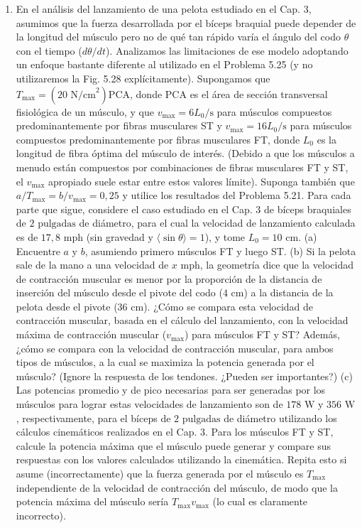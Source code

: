 \documentclass[12pt]{book}
\begin{document}
\begin{enumerate}
\item[5.26] En el análisis del lanzamiento de una pelota estudiado en el Cap. 3, asumimos que la fuerza desarrollada por el bíceps braquial puede depender de la longitud del músculo pero no de qué tan rápido varía el ángulo del codo $\theta$ con el tiempo ($d\theta/dt$). Analizamos las limitaciones de ese modelo adoptando un enfoque bastante diferente al utilizado en el Problema 5.25 (y no utilizaremos la Fig. 5.28 explícitamente). Supongamos que $T_{\text{max}} = (20\text{ N/cm}^2)\text{PCA}$, donde $\text{PCA}$ es el área de sección transversal fisiológica de un músculo, y que $v_{\text{max}} = 6 L_0/\text{s}$ para músculos compuestos predominantemente por fibras musculares ST y $v_{\text{max}} = 16 L_0/\text{s}$ para músculos compuestos predominantemente por fibras musculares FT, donde $L_0$ es la longitud de fibra óptima del músculo de interés. (Debido a que los músculos a menudo están compuestos por combinaciones de fibras musculares FT y ST, el $v_{\text{max}}$ apropiado suele estar entre estos valores límite). Suponga también que $a/T_{\text{max}} = b/v_{\text{max}} = 0{,}25$ y utilice los resultados del Problema 5.21. Para cada parte que sigue, considere el caso estudiado en el Cap. 3 de bíceps braquiales de $2\text{ pulgadas}$ de diámetro, para el cual la velocidad de lanzamiento calculada es de $17{,}8\text{ mph}$ (sin gravedad y $\langle \sin \theta \rangle = 1$), y tome $L_0 = 10\text{ cm}$.
(a) Encuentre $a$ y $b$, asumiendo primero músculos FT y luego ST.
(b) Si la pelota sale de la mano a una velocidad de $x\text{ mph}$, la geometría dice que la velocidad de contracción muscular es menor por la proporción de la distancia de inserción del músculo desde el pivote del codo ($4\text{ cm}$) a la distancia de la pelota desde el pivote ($36\text{ cm}$). ¿Cómo se compara esta velocidad de contracción muscular, basada en el cálculo del lanzamiento, con la velocidad máxima de contracción muscular ($v_{\text{max}}$) para músculos FT y ST? Además, ¿cómo se compara con la velocidad de contracción muscular, para ambos tipos de músculos, a la cual se maximiza la potencia generada por el músculo? (Ignore la respuesta de los tendones. ¿Pueden ser importantes?)
(c) Las potencias promedio y de pico necesarias para ser generadas por los músculos para lograr estas velocidades de lanzamiento son de $178\text{ W}$ y $356\text{ W}$, respectivamente, para el bíceps de $2\text{ pulgadas}$ de diámetro utilizando los cálculos cinemáticos realizados en el Cap. 3. Para los músculos FT y ST, calcule la potencia máxima que el músculo puede generar y compare sus respuestas con los valores calculados utilizando la cinemática. Repita esto si asume (incorrectamente) que la fuerza generada por el músculo es $T_{\text{max}}$ independiente de la velocidad de contracción del músculo, de modo que la potencia máxima del músculo sería $T_{\text{max}} v_{\text{max}}$ (lo cual es claramente incorrecto).

\end{enumerate}
\end{document}
